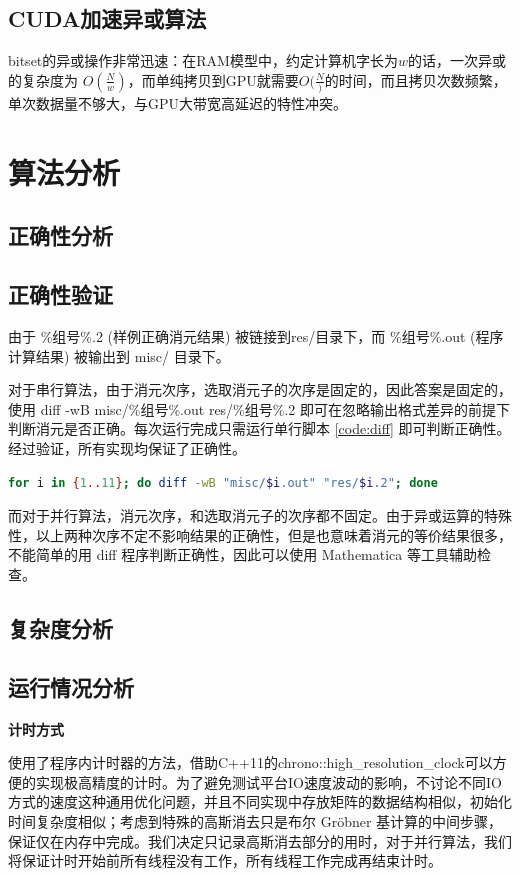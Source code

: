 \documentclass[a4paper]{article}
\begin{document}
\subsection{CUDA加速异或算法}
bitset的异或操作非常迅速：在RAM模型中，约定计算机字长为$w$的话，一次异或的复杂度为 $O(\frac{N}{w})$，而单纯拷贝到GPU就需要$O(\frac{N})$的时间，而且拷贝次数频繁，单次数据量不够大，与GPU大带宽高延迟的特性冲突。

\section{算法分析}
\subsection{正确性分析}

\subsection{正确性验证}
由于 \%组号\%.2 (样例正确消元结果) 被链接到res/目录下，而 \%组号\%.out (程序计算结果) 被输出到 misc/ 目录下。

对于串行算法，由于消元次序，选取消元子的次序是固定的，因此答案是固定的，使用 diff -wB misc/\%组号\%.out res/\%组号\%.2 即可在忽略输出格式差异的前提下判断消元是否正确。每次运行完成只需运行单行脚本 \ref{code:diff} 即可判断正确性。经过验证，所有实现均保证了正确性。
\begin{lstlisting}[frame=trbl, language={bash}, caption={单行 Bash 脚本}, label = {code:diff}]
  for i in {1..11}; do diff -wB "misc/$i.out" "res/$i.2"; done
\end{lstlisting}

而对于并行算法，消元次序，和选取消元子的次序都不固定。由于异或运算的特殊性，以上两种次序不定不影响结果的正确性，但是也意味着消元的等价结果很多，不能简单的用 diff 程序判断正确性，因此可以使用 Mathematica 等工具辅助检查。

\subsection{复杂度分析}

\subsection{运行情况分析}
\textbf{计时方式}

使用了程序内计时器的方法，借助C++11的chrono::high\_resolution\_clock可以方便的实现极高精度的计时。为了避免测试平台IO速度波动的影响，不讨论不同IO方式的速度这种通用优化问题，并且不同实现中存放矩阵的数据结构相似，初始化时间复杂度相似；考虑到特殊的高斯消去只是布尔 Gröbner 基计算的中间步骤，保证仅在内存中完成。我们决定只记录高斯消去部分的用时，对于并行算法，我们将保证计时开始前所有线程没有工作，所有线程工作完成再结束计时。
\end{document}
